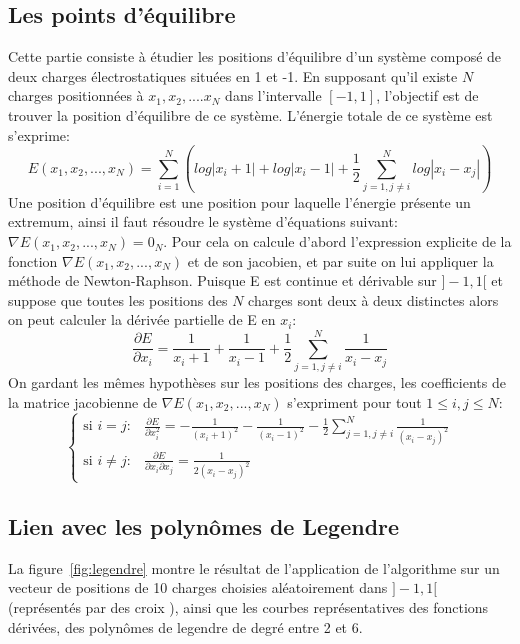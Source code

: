 \documentclass{article}
\begin{document}
\subsection{Les points d'équilibre }
Cette partie consiste à étudier les positions d’équilibre d’un système composé de deux charges
électrostatiques situées en 1 et -1. En supposant qu'il existe $N$ charges positionnées à $x_{1}, x_{2}, ....x_{N}$ dans l'intervalle $[-1, 1]$, l'objectif est de trouver la position d'équilibre de ce système.
L'énergie totale de ce système est s'exprime: 
\[ E(x_{1}, x_{2} , ... , x_{N}) = \sum _{i=1}^{N} \left( log|x_{i} + 1|+ log|x_{i} - 1| + \frac{1}{2} \sum _{j=1, j\neq i}^{N} log|x_{i} - x_{j}| \right )\]
Une position d'équilibre est une position pour laquelle l'énergie présente un extremum, ainsi il faut résoudre le système d'équations suivant: $\nabla E(x_{1}, x_{2} , ... , x_{N}) = 0_{N}$. Pour cela on calcule d'abord l'expression explicite de la fonction $\nabla E(x_{1}, x_{2} , ... , x_{N})$ et de son jacobien, et par suite on lui appliquer la méthode de Newton-Raphson.
Puisque E est continue et dérivable sur $]-1,1[$ et suppose que toutes les positions des $N$ charges sont deux à deux distinctes alors on peut calculer la dérivée partielle de E en $x_{i}$:
\[\frac{\partial E}{\partial x_{i}} = \frac{1}{x_{i} + 1}  + \frac{1}{x_{i} - 1} + \frac{1}{2} \sum _{j=1, j\neq i}^{N} \frac{1}{x_{i} - x_{j}}\]
On gardant les mêmes hypothèses sur les positions des charges, les coefficients de la matrice jacobienne de $\nabla E(x_{1}, x_{2} , ... , x_{N})$ s'expriment pour tout $1\leq i,j \leq N$:
\[
\begin{cases}
    \text{si } i=j:  &\displaystyle\frac{\partial E}{\partial x_{i}^{2}} = -\frac{1}{(x_{i} + 1)^{2}}  - \frac{1}{(x_{i} - 1)^{2}} - \frac{1}{2} \sum _{j=1, j\neq i}^{N} \frac{1}{(x_{i} - x_{j})^{2}} \\
    \text{si } i\neq j : & \displaystyle\frac{\partial E}{\partial x_{i}\partial x_{j}} = \frac{1}{2(x_{i} - x_{j})^{2}} 
\end{cases}
\]
\subsection{Lien avec les polynômes de Legendre}
La figure~\ref{fig:legendre} montre le résultat de l'application de l'algorithme sur un vecteur de positions de 10 charges choisies aléatoirement dans $]-1,1[$ (représentés par des croix ), ainsi que les courbes représentatives des fonctions dérivées, des polynômes de legendre de degré entre 2 et 6. 
\end{document}
